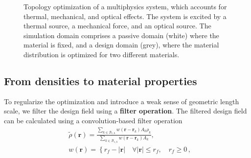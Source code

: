     \begin{figure}[bt]
      \centering
      \caption{Topology optimization of a multiphysics system, which accounts for thermal, mechanical, and optical effects. The system is excited by a thermal source, a mechanical force, and an optical source. The simulation domain comprises a passive domain (white) where the material is fixed, and a design domain (grey), where the material distribution is optimized for two different materials.}
          \label{fig:top_opt_multi}
   \end{figure}

    \subsection*{From densities to material properties}
    To regularize the optimization and introduce a weak sense of geometric length
    scale, we filter
    the design field using a \textbf{filter operation}. The filtered design field can
    be calculated using a
    convolution-based filter operation~\cite{projection}
       \begin{equation}\label{eq:filter_conv}
           \begin{aligned}
                & \tilde{\rho}(\mathbf{r})=\frac{\sum_{k \in \mathcal{B}_{e, h}}
    w\left(\mathbf{r}-\mathbf{r}_k\right) A_k \rho_k}{\sum_{k \in \mathcal{B}_{e,
    h}} w\left(\mathbf{r}-\mathbf{r}_k\right) A_k},                              \\
                & w(\mathbf{r})=\left\{r_f-|\mathbf{r}| \quad \forall|\mathbf{r}| \leq r_f,
    \quad r_f \geq 0\right.\,,
           \end{aligned}
       \end{equation}
   
